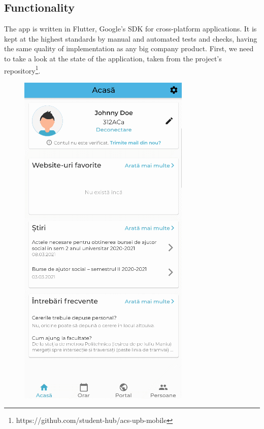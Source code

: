\subsection{Functionality} \label{3:specificapp_functionality}
The app is written in Flutter, Google’s SDK for cross-platform applications. It is kept at the highest standards by manual and automated tests and checks, having the same quality of implementation as any big company product. First, we need to take a look at the state of the application, taken from the project's repository\footnote{https://github.com/student-hub/acs-upb-mobile}.
\begin{figure}[!ht]
    \centering
    \begin{minipage}[b]{0.26\textwidth}
        \captionsetup{justification=centering}
        \includegraphics[width=\textwidth]{figures/beforedev/image10.png}

\end{minipage}
\end{figure}
